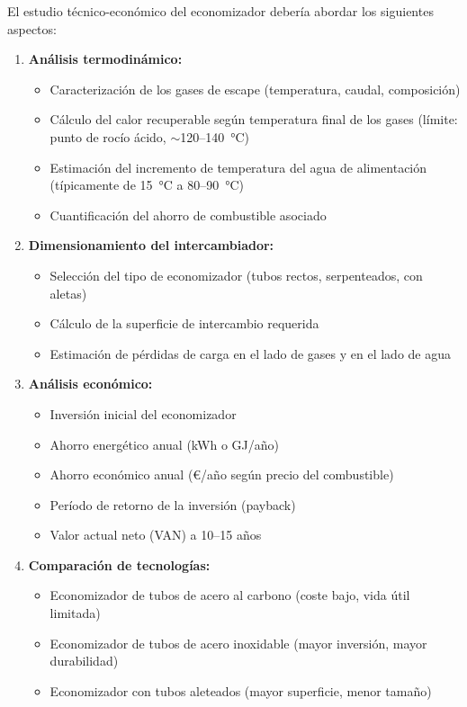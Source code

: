 El estudio técnico-económico del economizador debería abordar los siguientes aspectos:

\begin{enumerate}[label=\arabic*., leftmargin=2em]
	\item \textbf{Análisis termodinámico:}
	      \begin{itemize}[noitemsep]
		      \item Caracterización de los gases de escape (temperatura, caudal, composición)
		      \item Cálculo del calor recuperable según temperatura final de los gases (límite: punto de rocío ácido, $\sim$120--140~°C)
		      \item Estimación del incremento de temperatura del agua de alimentación (típicamente de 15~°C a 80--90~°C)
		      \item Cuantificación del ahorro de combustible asociado
	      \end{itemize}

	\item \textbf{Dimensionamiento del intercambiador:}
	      \begin{itemize}[noitemsep]
		      \item Selección del tipo de economizador (tubos rectos, serpenteados, con aletas)
		      \item Cálculo de la superficie de intercambio requerida
		      \item Estimación de pérdidas de carga en el lado de gases y en el lado de agua
	      \end{itemize}

	\item \textbf{Análisis económico:}
	      \begin{itemize}[noitemsep]
		      \item Inversión inicial del economizador
		      \item Ahorro energético anual (kWh o GJ/año)
		      \item Ahorro económico anual (€/año según precio del combustible)
		      \item Período de retorno de la inversión (payback)
		      \item Valor actual neto (VAN) a 10--15 años
	      \end{itemize}

	\item \textbf{Comparación de tecnologías:}
	      \begin{itemize}[noitemsep]
		      \item Economizador de tubos de acero al carbono (coste bajo, vida útil limitada)
		      \item Economizador de tubos de acero inoxidable (mayor inversión, mayor durabilidad)
		      \item Economizador con tubos aleteados (mayor superficie, menor tamaño)
	      \end{itemize}
\end{enumerate}


